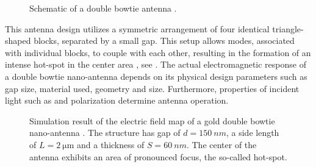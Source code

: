 		\begin{figure}[thp]
				\centering
				\caption[Schematic of a double bowtie antenna]{Schematic of a double bowtie antenna \cite{rahbany2016towards, Rahbany2015, Rahbany2016}.}
				\label{fig::double_bowtie_antenna_schematic}
		\end{figure}

		This antenna design utilizes a symmetric arrangement of four identical triangle-shaped blocks, separated by a small gap. This setup allows \LSP modes, associated with individual blocks, to couple with each other, resulting in the formation of an intense hot-spot in the center area \cite{ghenuche2008spectroscopic}, see . The actual electromagnetic response of a double bowtie nano-antenna depends on its physical design parameters such as gap size, material used, geometry and size. Furthermore, properties of incident light such as \wl and polarization determine antenna operation.

		\begin{figure}[thp]
				\centering
				\label{fig::double_bow_tie_hotspot}
				\caption[Hot-spot of a double bowtie antenna]{Simulation result of the electric field map of a gold double bowtie nano-antenna \cite{rahbany2016towards, Rahbany2015, Rahbany2016}. The structure has gap of $d = \SI{150}{nm}$, a side length of $L = \SI{2}{\micro\meter}$ and a thickness of $S = \SI{60}{nm}$. The center of the antenna exhibits an area of pronounced focus, the so-called hot-spot.}
		\end{figure}


